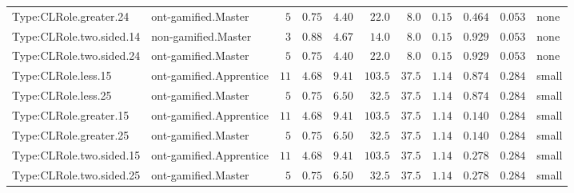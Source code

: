 \documentclass[6pt,a4paper]{article}
\begin{document}
{\begin{longtable}{llrrrrrrrrl}
Type:CLRole.greater.24&ont-gamified.Master&$ 5$&$0.75$&$ 4.40$&$ 22.0$&$  8.0$&$ 0.15$&$0.464$&$0.053$&none\tabularnewline
Type:CLRole.two.sided.14&non-gamified.Master&$ 3$&$0.88$&$ 4.67$&$ 14.0$&$  8.0$&$ 0.15$&$0.929$&$0.053$&none\tabularnewline
Type:CLRole.two.sided.24&ont-gamified.Master&$ 5$&$0.75$&$ 4.40$&$ 22.0$&$  8.0$&$ 0.15$&$0.929$&$0.053$&none\tabularnewline
Type:CLRole.less.15&ont-gamified.Apprentice&$11$&$4.68$&$ 9.41$&$103.5$&$ 37.5$&$ 1.14$&$0.874$&$0.284$&small\tabularnewline
Type:CLRole.less.25&ont-gamified.Master&$ 5$&$0.75$&$ 6.50$&$ 32.5$&$ 37.5$&$ 1.14$&$0.874$&$0.284$&small\tabularnewline
Type:CLRole.greater.15&ont-gamified.Apprentice&$11$&$4.68$&$ 9.41$&$103.5$&$ 37.5$&$ 1.14$&$0.140$&$0.284$&small\tabularnewline
Type:CLRole.greater.25&ont-gamified.Master&$ 5$&$0.75$&$ 6.50$&$ 32.5$&$ 37.5$&$ 1.14$&$0.140$&$0.284$&small\tabularnewline
\newpage
Type:CLRole.two.sided.15&ont-gamified.Apprentice&$11$&$4.68$&$ 9.41$&$103.5$&$ 37.5$&$ 1.14$&$0.278$&$0.284$&small\tabularnewline
Type:CLRole.two.sided.25&ont-gamified.Master&$ 5$&$0.75$&$ 6.50$&$ 32.5$&$ 37.5$&$ 1.14$&$0.278$&$0.284$&small\tabularnewline
\hline
\end{longtable}}
\end{document}
